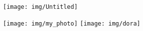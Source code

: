 \newpage
\BgThispage
\begin{center}
    \begin{figure}[H]
        \centering
        \texttt{[image: img/Untitled]}
    \end{figure}
    \begin{figure}[H]
        \centering
        \texttt{[image: img/my\_photo]}
        \texttt{[image: img/dora]}
    \end{figure}
\end{center}
